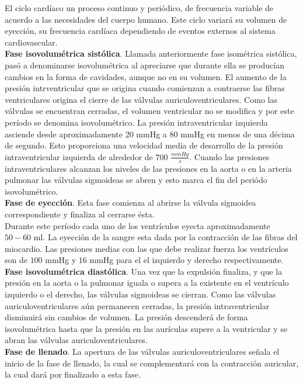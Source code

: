 El ciclo cardíaco un proceso continuo y periódico, de frecuencia variable de acuerdo a las necesidades del cuerpo
humano. Este ciclo variará su volumen de eyección, su frecuencia cardíaca dependiendo de eventos externos al sistema
cardiovascular. \\
\indent \textbf{Fase isovolumétrica sistólica}. Llamada anteriormente fase isométrica sistólica, pasó
a denominarse isovolumétrica al apreciarse que durante ella se producían cambios en la forma de cavidades, aunque no
en su volumen. El aumento de la presión intrventricular que se origina cuando comienzan a contraerse las fibras
ventriculares origina el cierre de las válvulas auriculoventriculares. Como las válvulas se encuentran cerradas, el
volumen ventricular no se modifica y por este período se denomina isovolumétrico. La presión intraventricular izquierda
asciende desde aproximadamente 20 mmHg a 80 mmHg en menos de una décima de segundo. Esto proporciona una velocidad
media de desarrollo de la presión intraventricular izquierda de alrededor de 700 $\frac{mmHg}{s}$. Cuando las
presiones intraventriculares alcanzan los niveles de las presiones en la aorta o en la arteria pulmonar las válvulas
sigmoideas se abren y esto marca el fin del periódo isovolumétrico. \\
\indent \textbf{Fase de eyección}. Esta fase comienza al abrirse la válvula sigmoidea correspondiente y finaliza al
cerrarse ésta. \\
\indent Durante este período cada uno de los ventrículos eyecta aproximadamente $50-60$ ml. La eyección de la sangre
esta dada por la contracción de las fibras del miocardio. Las presiones medias con las que debe realizar fuerza los
ventrículos son de $100$ mmHg y $16$ mmHg para el el izquierdo y derecho respectivamente. \\
\indent \textbf{Fase isovolumétrica diastólica}. Una vez que la expulsión finaliza, y que la presión en la aorta o
la pulmonar iguala o supera a la existente en el ventrículo izquierdo o el derecho, las válvulas sigmoideas se
cierran. Como las válvulas auriculoventriculares aún permanecen cerradas, la presión intraventricular disminuirá sin
cambios de volumen. La presión descenderá de forma isovolumétrica hasta que la presión en las aurículas supere a la
ventricular y se abran las válvulas auriculoventriculares. \\
\indent \textbf{Fase de llenado}. La apertura de las válvulas auriculoventriculares señala el inicio de la fase de
llenado, la cual se complementará con la contracción auricular, la cual dará por finalizado a esta fase.

